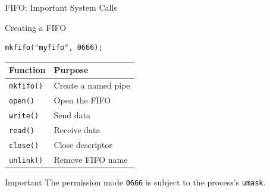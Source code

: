 \documentclass[aspectratio=169,10pt]{beamer}
\begin{document}
\begin{frame}[fragile]{FIFO: Important System Calls}

\begin{block}{Creating a FIFO}
\begin{lstlisting}[style=cstyle]
mkfifo("myfifo", 0666);
\end{lstlisting}
\end{block}

\begin{center}
\begin{tabular}{ll}
\toprule
\textbf{Function} & \textbf{Purpose}\\
\midrule
\texttt{mkfifo()} & Create a named pipe\\
\texttt{open()} & Open the FIFO\\
\texttt{write()} & Send data\\
\texttt{read()} & Receive data\\
\texttt{close()} & Close descriptor\\
\texttt{unlink()} & Remove FIFO name\\
\bottomrule
\end{tabular}
\end{center}

\begin{alertblock}{Important}
The permission mode \texttt{0666} is subject
to the process's \texttt{umask}.
\end{alertblock}

\end{frame}
\end{document}
